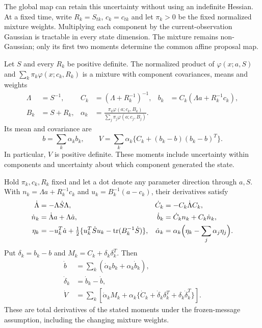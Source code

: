 The global map can retain this uncertainty without using an indefinite
Hessian. At a fixed time, write $R_k=S_{tk}$, $c_k=c_{tk}$ and let $\pi_k>0$
be the fixed normalized mixture weights. Multiplying each component by the
current-observation Gaussian is tractable in every state dimension. The
mixture remains non-Gaussian; only its first two moments determine the common
affine proposal map.

\begin{proposition}
\label{prop:bg-product-moments}
Let $S$ and every $R_k$ be positive definite. The normalized product of
$\varphi(x;a,S)$ and $\sum_k\pi_k\varphi(x;c_k,R_k)$ is a mixture with
component covariances, means and weights
\begin{align}
 \Lambda&=S^{-1}, & C_k&=(\Lambda+R_k^{-1})^{-1}, &
 b_k&=C_k(\Lambda a+R_k^{-1}c_k),\label{eq:bg-product-components}\\
 B_k&=S+R_k, &
 \alpha_k&=\frac{\pi_k\varphi(a;c_k,B_k)}
 {\sum_j\pi_j\varphi(a;c_j,B_j)}.\label{eq:bg-product-weights}
\end{align}
Its mean and covariance are
\begin{equation}
 b=\sum_k\alpha_k b_k,\qquad
 V=\sum_k\alpha_k\{C_k+(b_k-b)(b_k-b)^T\}.
 \label{eq:bg-product-moments}
\end{equation}
In particular, $V$ is positive definite. These moments include uncertainty
within components and uncertainty about which component generated the state.

Hold $\pi_k,c_k,R_k$ fixed and let a dot denote any parameter direction
through $a,S$. With $n_k=\Lambda a+R_k^{-1}c_k$ and
$u_k=B_k^{-1}(a-c_k)$, their derivatives satisfy
\begin{align}
 \dot\Lambda&=-\Lambda\dot S\Lambda,&
 \dot C_k&=-C_k\dot\Lambda C_k,\label{eq:bg-product-component-tangent}\\
 \dot n_k&=\dot\Lambda a+\Lambda\dot a,&
 \dot b_k&=\dot C_k n_k+C_k\dot n_k,\nonumber\\
 \eta_k&=-u_k^T\dot a+
 \tfrac12\{u_k^T\dot S u_k-\operatorname{tr}(B_k^{-1}\dot S)\},&
 \dot\alpha_k&=\alpha_k\Bigl(\eta_k-\sum_j\alpha_j\eta_j\Bigr).
 \label{eq:bg-product-weight-tangent}
\end{align}
Put $\delta_k=b_k-b$ and $M_k=C_k+\delta_k\delta_k^T$. Then
\begin{align}
 \dot b&=\sum_k(\dot\alpha_k b_k+\alpha_k\dot b_k),\nonumber\\
 \dot\delta_k&=\dot b_k-\dot b,\nonumber\\
 \dot V&=\sum_k\left[\dot\alpha_k M_k+
 \alpha_k\{\dot C_k+\dot\delta_k\delta_k^T+
 \delta_k\dot\delta_k^T\}\right].
 \label{eq:bg-product-moment-tangent}
\end{align}
These are total derivatives of the stated moments under the frozen-message
assumption, including the changing mixture weights.
\end{proposition}
